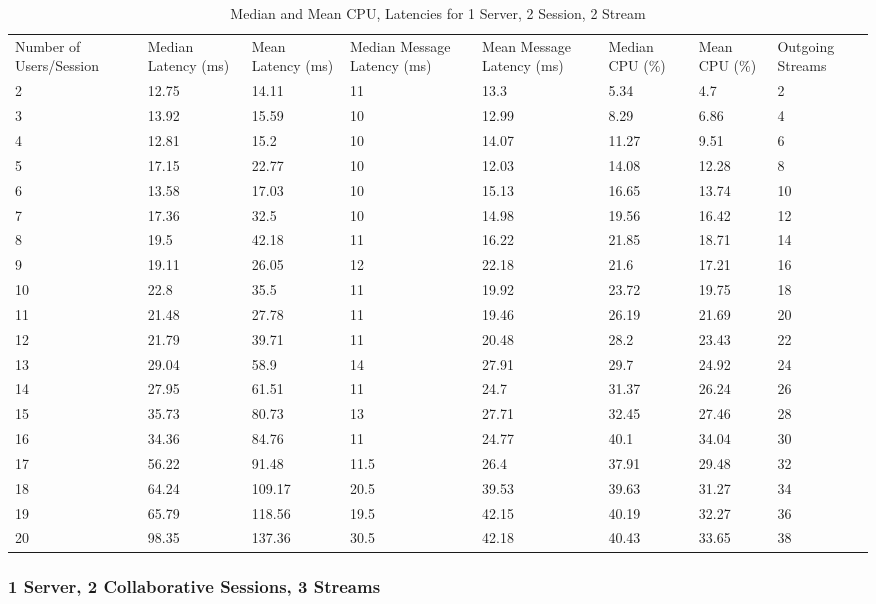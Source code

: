 \begin{table}
\caption{Median and Mean CPU, Latencies for 1 Server, 2 Session, 2 Stream}
\label{table:1serv_2sess_2str}
\begin{tabu} to\linewidth{|X[c]|X[c]|X[c]|X[c]|X[c]|X[c]|X[c]|X[c]|}
\everyrow{\hline}
\hline
Number of Users/Session & Median Latency (ms) & Mean Latency (ms) & Median Message Latency (ms) & Mean Message Latency (ms) & Median CPU (\%) & Mean CPU (\%) & Outgoing Streams\\
2 & 12.75 & 14.11 & 11 & 13.3 & 5.34 & 4.7 & 2 \\
3 & 13.92 & 15.59 & 10 & 12.99 & 8.29 & 6.86 & 4 \\
4 & 12.81 & 15.2 & 10 & 14.07 & 11.27 & 9.51 & 6 \\
5 & 17.15 & 22.77 & 10 & 12.03 & 14.08 & 12.28 & 8 \\
6 & 13.58 & 17.03 & 10 & 15.13 & 16.65 & 13.74 & 10 \\
7 & 17.36 & 32.5 & 10 & 14.98 & 19.56 & 16.42 & 12 \\
8 & 19.5 & 42.18 & 11 & 16.22 & 21.85 & 18.71 & 14 \\
9 & 19.11 & 26.05 & 12 & 22.18 & 21.6 & 17.21 & 16 \\
10 & 22.8 & 35.5 & 11 & 19.92 & 23.72 & 19.75 & 18 \\
11 & 21.48 & 27.78 & 11 & 19.46 & 26.19 & 21.69 & 20 \\
12 & 21.79 & 39.71 & 11 & 20.48 & 28.2 & 23.43 & 22 \\
13 & 29.04 & 58.9 & 14 & 27.91 & 29.7 & 24.92 & 24 \\
14 & 27.95 & 61.51 & 11 & 24.7 & 31.37 & 26.24 & 26 \\
15 & 35.73 & 80.73 & 13 & 27.71 & 32.45 & 27.46 & 28 \\
16 & 34.36 & 84.76 & 11 & 24.77 & 40.1 & 34.04 & 30 \\
17 & 56.22 & 91.48 & 11.5 & 26.4 & 37.91 & 29.48 & 32 \\
18 & 64.24 & 109.17 & 20.5 & 39.53 & 39.63 & 31.27 & 34 \\
19 & 65.79 & 118.56 & 19.5 & 42.15 & 40.19 & 32.27 & 36 \\
20 & 98.35 & 137.36 & 30.5 & 42.18 & 40.43 & 33.65 & 38 \\
\end{tabu}
\end{table}

\clearpage\subsubsection{1 Server, 2 Collaborative Sessions, 3 Streams}
\label{sec:1serv_2sess_3str}


